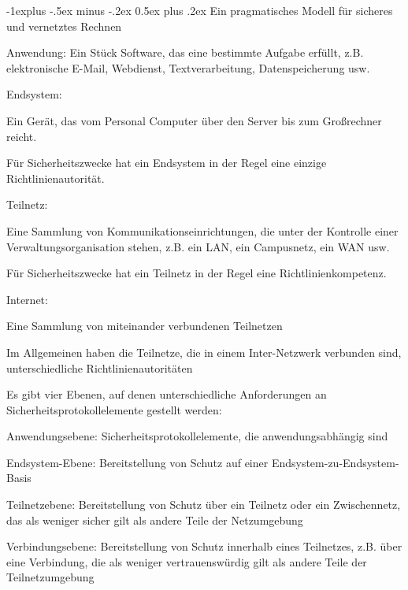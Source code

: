 \documentclass[a4paper]{article}
\makeatletter
\renewcommand{\subsection}{\@startsection{subsection}{2}{0mm}%
 {-1explus -.5ex minus -.2ex}%
 {0.5ex plus .2ex}%
 {\normalfont\normalsize\bfseries}}
\makeatother
\begin{document}
\begin{multicols}{3}
      \subsection{Ein pragmatisches Modell für sicheres und vernetztes Rechnen}
      \begin{itemize*}
            \item Anwendung: Ein Stück Software, das eine bestimmte Aufgabe erfüllt, z.B. elektronische E-Mail, Webdienst, Textverarbeitung, Datenspeicherung usw.
            \item Endsystem:
            \begin{itemize*}
                  \item Ein Gerät, das vom Personal Computer über den Server bis zum Großrechner reicht.
                  \item Für Sicherheitszwecke hat ein Endsystem in der Regel eine einzige Richtlinienautorität.
            \end{itemize*}
            \item Teilnetz:
            \begin{itemize*}
                  \item Eine Sammlung von Kommunikationseinrichtungen, die unter der Kontrolle einer Verwaltungsorganisation stehen, z.B. ein LAN, ein Campusnetz, ein WAN usw.
                  \item Für Sicherheitszwecke hat ein Teilnetz in der Regel eine Richtlinienkompetenz.
            \end{itemize*}
            \item Internet:
            \begin{itemize*}
                  \item Eine Sammlung von miteinander verbundenen Teilnetzen
                  \item Im Allgemeinen haben die Teilnetze, die in einem Inter-Netzwerk verbunden sind, unterschiedliche Richtlinienautoritäten
            \end{itemize*}
            \item Es gibt vier Ebenen, auf denen unterschiedliche Anforderungen an Sicherheitsprotokollelemente gestellt werden:
            \begin{itemize*}
                  \item Anwendungsebene: Sicherheitsprotokollelemente, die anwendungsabhängig sind
                  \item Endsystem-Ebene: Bereitstellung von Schutz auf einer Endsystem-zu-Endsystem-Basis
                  \item Teilnetzebene: Bereitstellung von Schutz über ein Teilnetz oder ein Zwischennetz, das als weniger sicher gilt als andere Teile der Netzumgebung
                  \item Verbindungsebene: Bereitstellung von Schutz innerhalb eines Teilnetzes, z.B. über eine Verbindung, die als weniger vertrauenswürdig gilt als andere Teile der Teilnetzumgebung
            \end{itemize*}
      \end{itemize*}


\end{multicols}
\end{document}
